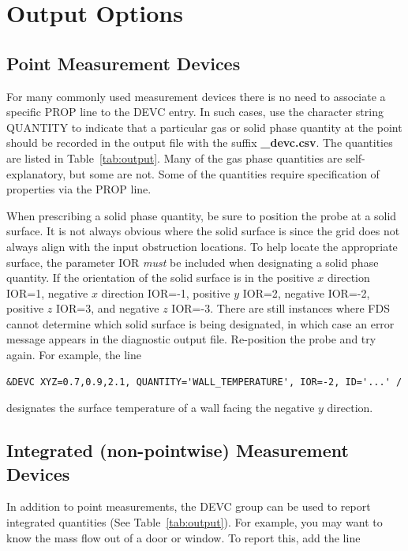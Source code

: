 \documentclass[11pt]{book}
\begin{document}
\section{Output Options}

\subsection{Point Measurement Devices}

For many commonly used measurement devices there is no need to associate a
specific {\ct PROP} line to the {\ct DEVC} entry. In such cases, use the character string
{\ct QUANTITY} to indicate that a particular gas or solid phase quantity at the point should be recorded in
the output file with the suffix {\bf \_devc.csv}. The quantities are listed in Table~\ref{tab:output}.
Many of the gas phase quantities are self-explanatory, but some are not. Some of the quantities require specification of
properties via the {\ct PROP} line.

When prescribing a solid phase quantity, be sure to position the
probe at a solid surface. It is not always obvious where the
solid surface is since the grid does not always align with the input obstruction
locations. To help locate the appropriate surface, the parameter {\ct IOR} {\em must} be included
when designating a solid phase quantity.
If the orientation of the solid surface is in the
positive $x$ direction {\ct IOR=1}, negative $x$ direction {\ct IOR=-1},
positive $y$ {\ct IOR=2}, negative {\ct IOR=-2}, positive $z$ {\ct IOR=3},
and negative $z$ {\ct IOR=-3}. There are still instances where FDS cannot
determine which solid surface is being designated, in which case an
error message appears in the diagnostic output file.
Re-position the probe and try again. For example, the line

\footnotesize
\begin{verbatim}
&DEVC XYZ=0.7,0.9,2.1, QUANTITY='WALL_TEMPERATURE', IOR=-2, ID='...' /
\end{verbatim}
\normalsize

\noindent
designates the surface temperature of a wall facing the negative $y$
direction.



\subsection{Integrated (non-pointwise) Measurement Devices}

In addition to point measurements, the {\ct DEVC} group can be used
to report integrated quantities (See Table~\ref{tab:output}).
For example, you may want to know the mass flow out of a door or window.
To report this, add the line
\end{document}
